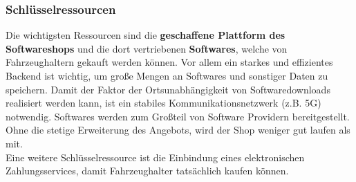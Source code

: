 \subsubsection{Schlüsselressourcen}
Die wichtigsten Ressourcen sind die \textbf{geschaffene Plattform des Softwareshops} und die dort vertriebenen \textbf{Softwares}, welche von Fahrzeughaltern gekauft werden können. Vor allem ein starkes und effizientes Backend ist wichtig, um große Mengen an Softwares und sonstiger Daten zu speichern. Damit der Faktor der Ortsunabhängigkeit von Softwaredownloads realisiert werden kann, ist ein stabiles Kommunikationsnetzwerk (z.B. 5G) notwendig. Softwares werden zum Großteil von Software Providern bereitgestellt. Ohne die stetige Erweiterung des Angebots, wird der Shop weniger gut laufen als mit.\\
Eine weitere Schlüsselressource ist die Einbindung eines elektronischen Zahlungsservices, damit Fahrzeughalter tatsächlich kaufen können.\\

